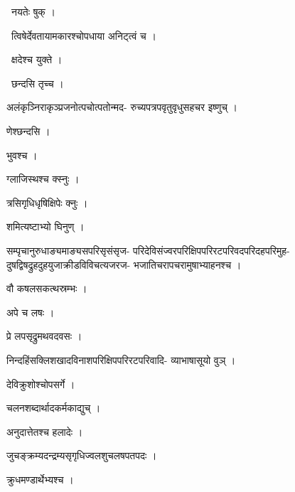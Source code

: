 \documentclass[10pt, openany, oneside]{book}
\begin{document}
\par\noindent\hspace{1.5em}{\vps वा॰}~{\qt नयतेः षुक् ।}

\par\noindent\hspace{1.5em}{\vps वा॰}~{\qt त्विषेर्देवतायामकारश्चोपधाया अनिट्त्वं च ।}

\par\noindent\hspace{1.5em}{\vps वा॰}~{\qt क्षदेश्च युक्ते ।}

\par\noindent\hspace{1.5em}{\vps वा॰}~{\qt छन्दसि तृच्च ।}

\noindent अलंकृञ्निराकृञ्प्रजनोत्पचोत्पतोन्मद- रुच्यपत्रपवृतुवृधुसहचर इष्णुच् ।

\noindent णेश्छन्दसि ।

\noindent भुवश्च ।

\noindent ग्लाजिस्थश्च क्स्नुः ।

\noindent त्रसिगृधिधृषिक्षिपेः क्नुः ।

\noindent शमित्यष्टाभ्यो घिनुण् ।

\noindent सम्पृचानुरुधाङ्यमाङ्यसपरिसृसंसृज- परिदेविसंज्वरपरिक्षिपपरिरटपरिवदपरिदहपरिमुह- दुषद्विषद्रुहदुहयुजाक्रीडविविचत्यजरज- भजातिचरापचरामुषाभ्याहनश्च ।

\noindent वौ कषलसकत्थस्रम्भः ।

\noindent अपे च लषः ।

\noindent प्रे लपसृद्रुमथवदवसः ।

\noindent निन्दहिंसक्लिशखादविनाशपरिक्षिपपरिरटपरिवादि- व्याभाषासूयो वुञ् ।

\noindent देविक्रुशोश्चोपसर्गे ।

\noindent चलनशब्दार्थादकर्मकाद्युच् ।

\noindent अनुदात्तेतश्च हलादेः ।

\noindent जुचङ्क्रम्यदन्द्रम्यसृगृधिज्वलशुचलषपतपदः ।

\noindent क्रुधमण्डार्थेभ्यश्च ।
\end{document}
